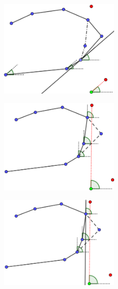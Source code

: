 \documentclass{beamer}
\begin{document}
\begin{frame}
 \begin{figure}[h]
 \includegraphics[width=6cm]{A-paralelas-3-3}
 \end{figure}
\end{frame}
\begin{frame}
 \begin{figure}[h]
 \includegraphics[width=6cm]{A-paralelas-3-2}
 \end{figure}
\end{frame}
\begin{frame}
 \begin{figure}[h]
 \includegraphics[width=6cm]{A-paralelas-3-4}
 \end{figure}
\end{frame}






\end{document}
